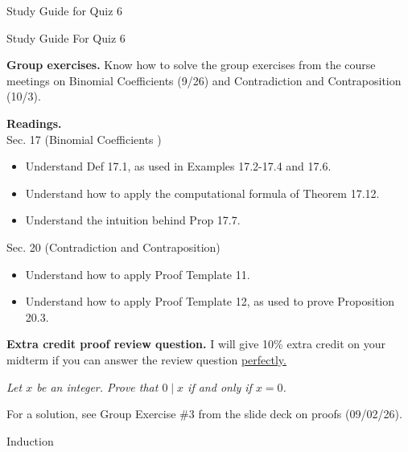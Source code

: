 \documentclass[10pt]{beamer}
\begin{document}
\begin{frame}[standout]
Study Guide for Quiz 6
\end{frame}


\begin{frame}{Study Guide For Quiz 6}
\footnotesize 

\colorbox{yellow!20}{\textbf{Group exercises.}} Know how to solve the group exercises from the course meetings on Binomial Coefficients (9/26) and Contradiction and Contraposition (10/3).  


\vfill 

\colorbox{red!20}{\textbf{Readings.}}  \\
\vspace{.2cm}
Sec. 17 (Binomial Coefficients )
\begin{itemize}
\item Understand Def 17.1, as used in Examples 17.2-17.4 and 17.6.
\item Understand how to apply the computational formula of Theorem 17.12.
\item Understand the intuition behind Prop 17.7.
\end{itemize}
Sec. 20 (Contradiction and Contraposition)
\begin{itemize}
\item Understand how to apply Proof Template 11.
\item Understand how to apply Proof Template 12, as used to prove Proposition 20.3.
\end{itemize}

\vfill 
\pause 
\colorbox{green!20}{\textbf{Extra credit proof review question.}}  I will give 10\% extra credit on your midterm if you can answer the review question \underline{perfectly.}  

\begin{center}
\textit{Let $x$ be an integer. Prove that $0 \mid x$ if and only if $x=0$.} 
\end{center}
For a solution, see Group Exercise \#3 from the  slide deck on proofs (09/02/26).
\end{frame}


\begin{frame}[standout]
Induction
\end{frame}
\end{document}
